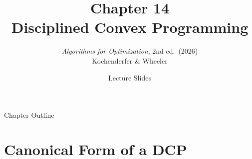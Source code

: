 \documentclass[aspectratio=169,10pt]{beamer}
\title[Ch.14 Disciplined Convex Programming]{%
  Chapter 14\\[4pt]
  \textbf{Disciplined Convex Programming}}
\subtitle{\textit{Algorithms for Optimization}, 2nd ed.\ (2026)\\
  Kochenderfer \& Wheeler}
\author{Lecture Slides}
\date{}
\begin{document}

\begin{frame}
  \titlepage
\end{frame}

\begin{frame}{Chapter Outline}
  \tableofcontents
\end{frame}

\section{Canonical Form of a DCP}
\end{document}

